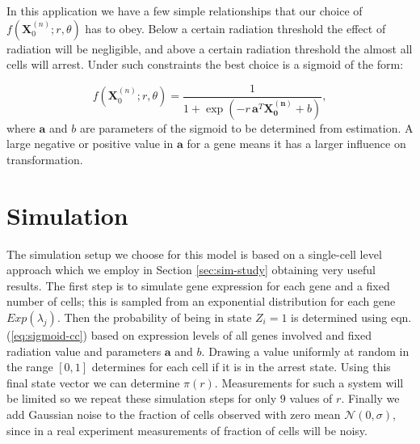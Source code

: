 In this application we have a few simple relationships that our choice of $f(\mathbf{X}_0^{(n)}; r, \theta)$ has to obey. Below a certain radiation threshold the effect of radiation will be negligible, and above a certain radiation threshold the almost all cells will arrest. Under such constraints the best choice is a sigmoid of the form:

\begin{equation}
  \label{eq:sigmoid-cc}
  f(\mathbf{X}_0^{(n)}; r, \theta) = \frac{1}{1 + \exp ( -r\, \mathbf{a}^T \mathbf{X_0^{(n)}} + b)},
\end{equation}
where $\mathbf{a}$ and $b$ are parameters of the sigmoid to be determined from estimation. A large negative or positive value in $\mathbf{a}$ for a gene means it has a larger influence on transformation.

\section{Simulation}
\label{sec:simulation}

The simulation setup we choose for this model is based on a single-cell level approach which we employ in Section \ref{sec:sim-study} obtaining very useful results. The first step is to simulate gene expression for each gene and a fixed number of cells; this is sampled from an exponential distribution for each gene $Exp(\lambda_j)$. Then the probability of being in state $Z_i = 1$  is determined using eqn. (\ref{eq:sigmoid-cc}) based on expression levels of all genes involved and fixed radiation value and parameters  $\mathbf{a}$ and $b$. Drawing a value uniformly at random in the range $[0, 1]$ determines for each cell if it is in the arrest state. Using this final state vector we can determine $\pi(r)$. Measurements for such a system will be limited so we repeat these simulation steps for only $9$ values of $r$. Finally we add Gaussian noise to the fraction of cells observed with zero mean $\mathcal{N}(0, \sigma)$, since in a real experiment measurements of fraction of cells will be noisy. 

